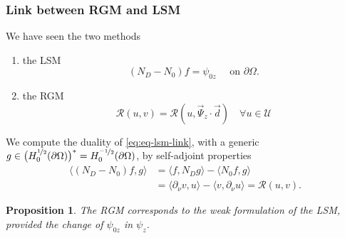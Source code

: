 \documentclass[10pt,xcolor={dvipsnames}]{beamer}
\newtheorem{proposition}[subsection]{Proposition}
\theoremstyle{plain}
\theoremstyle{plain}
\begin{document}
\begin{frame}
 \frametitle{Link between RGM and LSM}
 We have seen the two methods
 \begin{enumerate}
  \item the LSM
  \vspace{-0.1cm}
  \begin{equation}
  \label{eq:eq-lsm-link}
  ({N_D} - {N_0})f = \psi_{0z} \quad \text{ on }\partial \Omega.
  \end{equation}
  \item the RGM
  \vspace{-0.1cm}
  \begin{equation}
   \mathcal{R}(u, v) = \mathcal{R}(u, \vec{\Psi}_z\cdot\vec{d})\quad \forall u \in \mathcal{U}
  \end{equation}
 \end{enumerate}
% 
We compute the duality of \eqref{eq:eq-lsm-link}, with a generic 
${g \in \bigl(H^{\nicefrac{1}{2}}_0(\partial \Omega)\bigr)^* = H^{\nicefrac{-1}{2}}_0(\partial \Omega)}$, by self-adjoint properties
\begin{align*}
 \label{eq:link-duality-left}
 \langle({N_D} - {N_0})f,g\rangle & =  \langle f,{N_D} g\rangle - \langle {N_0} f,g\rangle \\
                                        & = \langle \partial_\nu v,u\rangle - \langle v,\partial_\nu u\rangle
                                        = \mathcal{R}(u,v).
\end{align*}
\begin{proposition}
 The RGM corresponds to the weak formulation of the LSM,
 provided the change of $\psi_{0z}$ in $\psi_z$.
\end{proposition}
\end{frame}
\end{document}
